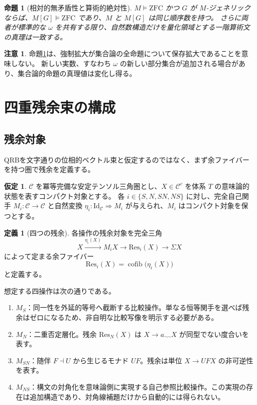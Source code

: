 \documentclass[11pt]{ltjsarticle}
\theoremstyle{plain}
\newtheorem{proposition}[theorem]{命題}
\theoremstyle{definition}
\newtheorem{definition}[theorem]{定義}
\newtheorem{assumption}[theorem]{仮定}
\newtheorem{remark}[theorem]{注意}
\newcommand{\Res}{\mathrm{Res}}
\begin{document}
\begin{proposition}[相対的無矛盾性と算術的絶対性]\label{prop:preservation}
\(M\models\mathrm{ZFC}\) かつ \(G\) が \(M\)-ジェネリックならば、\(M[G]\models\mathrm{ZFC}\) であり、\(M\) と \(M[G]\) は同じ順序数を持つ。
さらに両者が標準的な \(\omega\) を共有する限り、自然数構造だけを量化領域とする一階算術文の真理は一致する。
\end{proposition}

\begin{remark}
命題\ref{prop:preservation}は、強制拡大が集合論の全命題について保存拡大であることを意味しない。
新しい実数、すなわち \(\omega\) の新しい部分集合が追加される場合があり、集合論的命題の真理値は変化し得る。
\end{remark}

\section{四重残余束の構成}
\label{sec:qrb}

\subsection{残余対象}

QRBを文字通りの位相的ベクトル束と仮定するのではなく、まず余ファイバーを持つ圏で残余を定義する。

\begin{assumption}\label{ass:category}
\(\mathcal{C}\) を冪等完備な安定テンソル三角圏とし、\(X\in\mathcal{C}^c\) を体系 \(T\) の意味論的状態を表すコンパクト対象とする。
各 \(i\in\{S,N,SN,NS\}\) に対し、完全自己関手 \(M_i\colon\mathcal{C}\to\mathcal{C}\) と自然変換
\(\eta_i\colon\mathrm{Id}_{\mathcal{C}}\Rightarrow M_i\) が与えられ、\(M_i\) はコンパクト対象を保つとする。
\end{assumption}

\begin{definition}[四つの残余]
各操作の残余対象を完全三角
\[
X\xrightarrow{\eta_i(X)}M_iX\longrightarrow\Res_i(X)\longrightarrow\Sigma X
\]
によって定まる余ファイバー
\[
\Res_i(X)=\operatorname{cofib}\!\bigl(\eta_i(X)\bigr)
\]
と定義する。
\end{definition}

想定する四操作は次の通りである。
\begin{enumerate}
\item \(M_S\)：同一性を外延的等号へ截断する比較操作。単なる恒等関手を選べば残余はゼロになるため、非自明な比較写像を明示する必要がある。
\item \(M_N\)：二重否定層化。残余 \(\Res_N(X)\) は \(X\to a_{\neg\neg}X\) が同型でない度合いを表す。
\item \(M_{SN}\)：随伴 \(F\dashv U\) から生じるモナド \(UF\)。残余は単位 \(X\to UFX\) の非可逆性を表す。
\item \(M_{NS}\)：構文の対角化を意味論側に実現する自己参照比較操作。この実現の存在は追加構造であり、対角線補題だけから自動的には得られない。
\end{enumerate}
\end{document}
